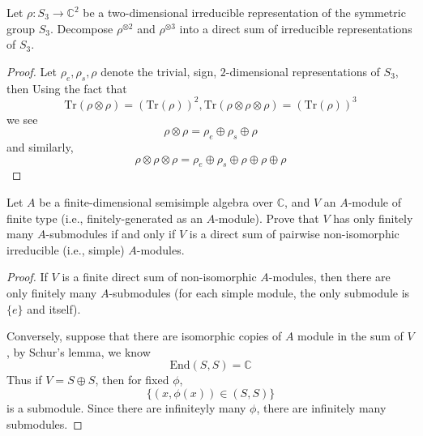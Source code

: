 \documentclass[openany]{book}
\newcommand{\C}{\mathbb{C}}
\begin{document}
\begin{prob}
    Let \(\rho:S_3\to\mathbb{C}^2\) be a two-dimensional irreducible representation of the symmetric group \(S_3\). Decompose \(\rho^{\otimes 2}\) and \(\rho^{\otimes 3}\) into a direct sum of irreducible representations of \(S_3\).
\end{prob}
\begin{proof}
    Let $\rho_e, \rho_s, \rho$ denote the trivial, sign, $2$-dimensional representations of $S_3$, then
    Using the fact that 
    \begin{equation*}
        \text{Tr}(\rho\otimes\rho)=(\text{Tr}(\rho))^2, \text{Tr}(\rho\otimes\rho\otimes\rho)=(\text{Tr}(\rho))^3
    \end{equation*}
    we see 
    \begin{equation*}
        \rho\otimes\rho= \rho_e\oplus\rho_s\oplus\rho
    \end{equation*}
    and similarly, 
    \begin{equation*}
        \rho\otimes\rho\otimes\rho=\rho_{e}\oplus\rho_s\oplus\rho\oplus\rho\oplus\rho
    \end{equation*}
\end{proof}


\begin{prob}
    Let \(A\) be a finite-dimensional semisimple algebra over \(\mathbb{C}\), and \(V\) an \(A\)-module of finite type (i.e., finitely-generated as an \(A\)-module). Prove that \(V\) has only finitely many \(A\)-submodules if and only if \(V\) is a direct sum of pairwise non-isomorphic irreducible (i.e., simple) \(A\)-modules.
\end{prob}
\begin{proof}
    If $V$ is a finite direct sum of non-isomorphic $A$-modules, then there are only finitely many $A$-submodules (for each simple module, the only submodule is $\{e\}$ and itself).

    Conversely, suppose that there are isomorphic copies of $A$ module in the sum of $V$, by Schur's lemma, we know 
    \begin{equation*}
        \text{End}(S,S)=\C
    \end{equation*}
    Thus if $V=S\oplus S$, then for fixed $\phi$,
    \begin{equation*}
        \{(x,\phi(x))\in (S,S)\}
    \end{equation*}
    is a submodule. Since there are infiniteyly many $\phi$, there are infinitely many submodules.
\end{proof}
\end{document}
